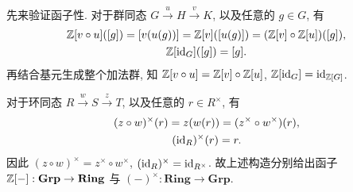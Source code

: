 \documentclass{article}
\begin{document}
\begin{solution}
	先来验证函子性. 对于群同态 $G \xrightarrow{u} H \xrightarrow{v} K$, 以及任意的 $g \in G$, 有
	\begin{gather*}
		\mathbb{Z}[v \circ u]([g]) = [v(u(g))] = \mathbb{Z}[v]([u(g)]) = (\mathbb{Z}[v] \circ \mathbb{Z}[u])([g]), \\
		\mathbb{Z}[\operatorname{id}_G]([g]) = [g].
	\end{gather*}
	再结合基元生成整个加法群, 知 $\mathbb{Z}[v \circ u] = \mathbb{Z}[v] \circ \mathbb{Z}[u]$, $\mathbb{Z}[\operatorname{id}_G] = \operatorname{id}_{\mathbb{Z}[G]}$.

	对于环同态 $R \xrightarrow{w} S \xrightarrow{z} T$, 以及任意的 $r \in R^\times$, 有
	\begin{gather*}
		(z \circ w)^\times(r) = z(w(r)) = (z^\times \circ w^\times)(r), \\
		(\operatorname{id}_R)^\times(r) = r.
	\end{gather*}
	因此 $(z \circ w)^\times = z^\times \circ w^\times$, $(\operatorname{id}_R)^\times = \operatorname{id}_{R^\times}$. 故上述构造分别给出函子 $\mathbb{Z}[-]: \mathbf{Grp} \to \mathbf{Ring}$ 与 $(-)^\times: \mathbf{Ring} \to \mathbf{Grp}$.


\end{solution}
\end{document}
